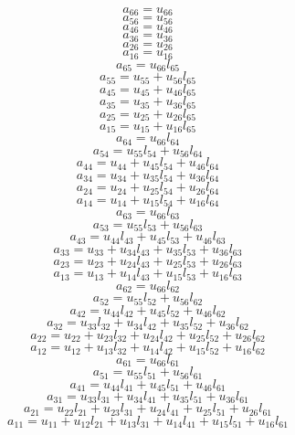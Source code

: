 \documentclass[10pt,a4paper,dvipdfmx]{article}
\begin{document}
\begin{multicols}{2}
$$ a_{{6}{6}} = u_{{6}{6}} $$
$$ a_{{5}{6}} = u_{{5}{6}} $$
$$ a_{{4}{6}} = u_{{4}{6}} $$
$$ a_{{3}{6}} = u_{{3}{6}} $$
$$ a_{{2}{6}} = u_{{2}{6}} $$
$$ a_{{1}{6}} = u_{{1}{6}} $$
$$ a_{{6}{5}} = u_{{6}{6}} l_{{6}{5}} $$
$$ a_{{5}{5}} = u_{{5}{5}} + u_{{5}{6}} l_{{6}{5}} $$
$$ a_{{4}{5}} = u_{{4}{5}} + u_{{4}{6}} l_{{6}{5}} $$
$$ a_{{3}{5}} = u_{{3}{5}} + u_{{3}{6}} l_{{6}{5}} $$
$$ a_{{2}{5}} = u_{{2}{5}} + u_{{2}{6}} l_{{6}{5}} $$
$$ a_{{1}{5}} = u_{{1}{5}} + u_{{1}{6}} l_{{6}{5}} $$
$$ a_{{6}{4}} = u_{{6}{6}} l_{{6}{4}} $$
$$ a_{{5}{4}} = u_{{5}{5}} l_{{5}{4}} + u_{{5}{6}} l_{{6}{4}} $$
$$ a_{{4}{4}} = u_{{4}{4}} + u_{{4}{5}} l_{{5}{4}} + u_{{4}{6}} l_{{6}{4}} $$
$$ a_{{3}{4}} = u_{{3}{4}} + u_{{3}{5}} l_{{5}{4}} + u_{{3}{6}} l_{{6}{4}} $$
$$ a_{{2}{4}} = u_{{2}{4}} + u_{{2}{5}} l_{{5}{4}} + u_{{2}{6}} l_{{6}{4}} $$
$$ a_{{1}{4}} = u_{{1}{4}} + u_{{1}{5}} l_{{5}{4}} + u_{{1}{6}} l_{{6}{4}} $$
$$ a_{{6}{3}} = u_{{6}{6}} l_{{6}{3}} $$
$$ a_{{5}{3}} = u_{{5}{5}} l_{{5}{3}} + u_{{5}{6}} l_{{6}{3}} $$
$$ a_{{4}{3}} = u_{{4}{4}} l_{{4}{3}} + u_{{4}{5}} l_{{5}{3}} + u_{{4}{6}} l_{{6}{3}} $$
$$ a_{{3}{3}} = u_{{3}{3}} + u_{{3}{4}} l_{{4}{3}} + u_{{3}{5}} l_{{5}{3}} + u_{{3}{6}} l_{{6}{3}} $$
$$ a_{{2}{3}} = u_{{2}{3}} + u_{{2}{4}} l_{{4}{3}} + u_{{2}{5}} l_{{5}{3}} + u_{{2}{6}} l_{{6}{3}} $$
$$ a_{{1}{3}} = u_{{1}{3}} + u_{{1}{4}} l_{{4}{3}} + u_{{1}{5}} l_{{5}{3}} + u_{{1}{6}} l_{{6}{3}} $$
$$ a_{{6}{2}} = u_{{6}{6}} l_{{6}{2}} $$
$$ a_{{5}{2}} = u_{{5}{5}} l_{{5}{2}} + u_{{5}{6}} l_{{6}{2}} $$
$$ a_{{4}{2}} = u_{{4}{4}} l_{{4}{2}} + u_{{4}{5}} l_{{5}{2}} + u_{{4}{6}} l_{{6}{2}} $$
$$ a_{{3}{2}} = u_{{3}{3}} l_{{3}{2}} + u_{{3}{4}} l_{{4}{2}} + u_{{3}{5}} l_{{5}{2}} + u_{{3}{6}} l_{{6}{2}} $$
$$ a_{{2}{2}} = u_{{2}{2}} + u_{{2}{3}} l_{{3}{2}} + u_{{2}{4}} l_{{4}{2}} + u_{{2}{5}} l_{{5}{2}} + u_{{2}{6}} l_{{6}{2}} $$
$$ a_{{1}{2}} = u_{{1}{2}} + u_{{1}{3}} l_{{3}{2}} + u_{{1}{4}} l_{{4}{2}} + u_{{1}{5}} l_{{5}{2}} + u_{{1}{6}} l_{{6}{2}} $$
$$ a_{{6}{1}} = u_{{6}{6}} l_{{6}{1}} $$
$$ a_{{5}{1}} = u_{{5}{5}} l_{{5}{1}} + u_{{5}{6}} l_{{6}{1}} $$
$$ a_{{4}{1}} = u_{{4}{4}} l_{{4}{1}} + u_{{4}{5}} l_{{5}{1}} + u_{{4}{6}} l_{{6}{1}} $$
$$ a_{{3}{1}} = u_{{3}{3}} l_{{3}{1}} + u_{{3}{4}} l_{{4}{1}} + u_{{3}{5}} l_{{5}{1}} + u_{{3}{6}} l_{{6}{1}} $$
$$ a_{{2}{1}} = u_{{2}{2}} l_{{2}{1}} + u_{{2}{3}} l_{{3}{1}} + u_{{2}{4}} l_{{4}{1}} + u_{{2}{5}} l_{{5}{1}} + u_{{2}{6}} l_{{6}{1}} $$
$$ a_{{1}{1}} = u_{{1}{1}} + u_{{1}{2}} l_{{2}{1}} + u_{{1}{3}} l_{{3}{1}} + u_{{1}{4}} l_{{4}{1}} + u_{{1}{5}} l_{{5}{1}} + u_{{1}{6}} l_{{6}{1}} $$

\end{multicols}
\end{document}
